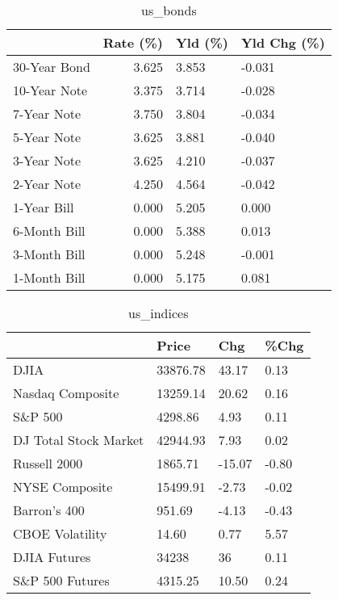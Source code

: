 \documentclass{article}%
\begin{document}
%


\begin{table}[htbp]%
\caption{us\_bonds}%
\centering%
\begin{adjustbox}{width=1\textwidth}%
\begin{tabular}{lrll}
\toprule
             &  Rate (\%) & Yld (\%) & Yld Chg (\%) \\
\midrule
30-Year Bond &     3.625 &   3.853 &      -0.031 \\
10-Year Note &     3.375 &   3.714 &      -0.028 \\
 7-Year Note &     3.750 &   3.804 &      -0.034 \\
 5-Year Note &     3.625 &   3.881 &      -0.040 \\
 3-Year Note &     3.625 &   4.210 &      -0.037 \\
 2-Year Note &     4.250 &   4.564 &      -0.042 \\
 1-Year Bill &     0.000 &   5.205 &       0.000 \\
6-Month Bill &     0.000 &   5.388 &       0.013 \\
3-Month Bill &     0.000 &   5.248 &      -0.001 \\
1-Month Bill &     0.000 &   5.175 &       0.081 \\
\bottomrule
\end{tabular}
%
\end{adjustbox}%
\end{table}

%


\begin{table}[htbp]%
\caption{us\_indices}%
\centering%
\begin{adjustbox}{width=1\textwidth}%
\begin{tabular}{llll}
\toprule
                      &    Price &    Chg &  \%Chg \\
\midrule
                 DJIA & 33876.78 &  43.17 &  0.13 \\
     Nasdaq Composite & 13259.14 &  20.62 &  0.16 \\
              S\&P 500 &  4298.86 &   4.93 &  0.11 \\
DJ Total Stock Market & 42944.93 &   7.93 &  0.02 \\
         Russell 2000 &  1865.71 & -15.07 & -0.80 \\
       NYSE Composite & 15499.91 &  -2.73 & -0.02 \\
         Barron's 400 &   951.69 &  -4.13 & -0.43 \\
      CBOE Volatility &    14.60 &   0.77 &  5.57 \\
         DJIA Futures &    34238 &     36 &  0.11 \\
      S\&P 500 Futures &  4315.25 &  10.50 &  0.24 \\
\bottomrule
\end{tabular}
%
\end{adjustbox}%
\end{table}
\end{document}
